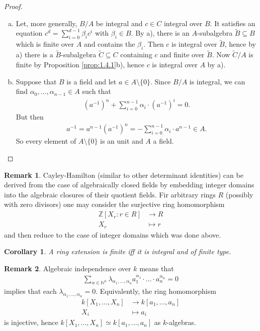 \documentclass[DIV=14,parskip=half]{scrartcl}
\newenvironment{alphanumerate}{\begin{enumerate}[a)]}{\end{enumerate}}
\newtheorem{cor}{Corollary}[subsection]
\theoremstyle{definition}
\newtheorem{rem}{Remark}[subsection]
\newcommand{\N}{\mathbb{N}}
\newcommand{\Z}{\mathbb{Z}}
\newcommand{\longto}{\longrightarrow}
\newcommand{\ldotspam}{,\ldots,}
\begin{document}
\begin{proof}
\begin{alphanumerate}
  \item Let, more generally, $B/A$ be integral and $c\in C$ integral over $B$. It satisfies an equation $c^d = \sum_{i=0}^{d-1} \beta_i c^i$ with $\beta_i\in B$. By a), there is an $A$-subalgebra $\tilde B\subseteq B$ which is finite over $A$ and contains the $\beta_i$. Then $c$ is integral over $\tilde B$, hence by a) there is a $\tilde B$-subalgebra $\tilde C\subseteq C$ containing $c$ and finite over $\tilde B$. Now $\tilde C/A$ is finite by Proposition \ref{prop:1.4.1}b), hence $c$ is integral over $A$ by a).
\item Suppose that $B$ is a field and let $a\in A \setminus\{0\}$. Since $B/A$ is integral, we can find $\alpha_0\ldotspam \alpha_{n-1}\in A$ such that 
\begin{align*}
 \left(a^{-1}\right)^n+\sum_{i=0}^{n-1}\alpha_i\cdot\left(a^{-1}\right)^i = 0.
\end{align*}
But then 
\begin{align*}
 a^{-1} = a^{n-1}\left(a^{-1}\right)^n = -\sum_{i=0}^{n-1} \alpha_i\cdot a^{n-1} \in A.
 \end{align*}
So every element of $A\setminus\{0\}$ is an unit and $A$ a field.
 \end{alphanumerate}
\end{proof}
\begin{rem}
 Cayley-Hamilton (similar to other determinant identities) can be derived from the case of algebraically closed fields by embedding integer domains into the algebraic closures of their quotient fields. Fir arbitrary rings $R$ (possibly with zero divisors) one may consider the surjective ring homomorphism
 \begin{align*}
  \Z[X_r: r\in R] &\longto R\\
  X_r &\longmapsto r
 \end{align*}
 and then reduce to the case of integer domains which was done above.

\end{rem}
\begin{cor}
 A ring extension is finite iff it is integral and of finite type.
\end{cor}
\begin{rem}
 Algebraic independence over $k$ means that
 \begin{align*}
  \sum_{\alpha\in \N^n} \lambda_{\alpha_1\ldotspam \alpha_n} a_1^{\alpha_1}\cdot\ldots\cdot a_n^{\alpha_n}=0
 \end{align*}
implies that each $\lambda_{\alpha_1\ldotspam \alpha_n}=0$. Equivalently, the ring homomorphism 
\begin{align*}
 k[X_1,\ldots, X_n]&\longto k[a_1,\ldots, a_n]\\
 X_i&\longmapsto a_i
\end{align*}
is injective, hence $k[X_1,\ldots, X_n]\simeq k[a_1,\ldots, a_n]$ as $k$-algebras.
\end{rem}
\end{document}
